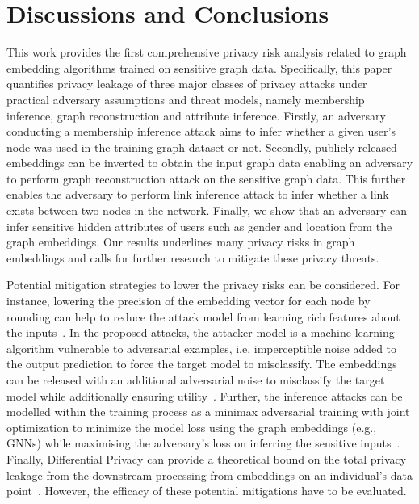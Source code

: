\vspace{-2mm}
\section{Discussions and Conclusions}
\label{conclusions}

This work provides the first comprehensive privacy risk analysis related to graph embedding algorithms trained on sensitive graph data.
Specifically, this paper quantifies privacy leakage of three major classes of privacy attacks under practical adversary assumptions and threat models, namely membership inference, graph reconstruction and attribute inference.
Firstly, an adversary conducting a membership inference attack aims to infer whether a given user's node was used in the training graph dataset or not.
Secondly, publicly released embeddings can be inverted to obtain the input graph data enabling an adversary to perform graph reconstruction attack on the sensitive graph data.
This further enables the adversary to perform link inference attack to infer whether a link exists between two nodes in the network.
Finally, we show that an adversary can infer sensitive hidden attributes of users such as gender and location from the graph embeddings.
Our results underlines many privacy risks in graph embeddings and calls for further research to mitigate these privacy threats.


Potential mitigation strategies to lower the privacy risks can be considered.
For instance, lowering the precision of the embedding vector for each node by rounding can help to reduce the attack model from learning rich features about the inputs~\cite{membershipinf,nlp}.
In the proposed attacks, the attacker model is a machine learning algorithm vulnerable to adversarial examples, i.e, imperceptible noise added to the output prediction to force the target model to misclassify.
The embeddings can be released with an additional adversarial noise to misclassify the target model while additionally ensuring utility~\cite{attriguard,memguard}.
Further, the inference attacks can be modelled within the training process as a minimax adversarial training with joint optimization to minimize the model loss using the graph embeddings (e.g., GNNs) while maximising the adversary's loss on inferring the sensitive inputs~\cite{advreg,textembleak}.
Finally, Differential Privacy can provide a theoretical bound on the total privacy leakage from the downstream processing from embeddings on an individual's data point~\cite{dptext,dpne}.
However, the efficacy of these potential mitigations have to be evaluated.






